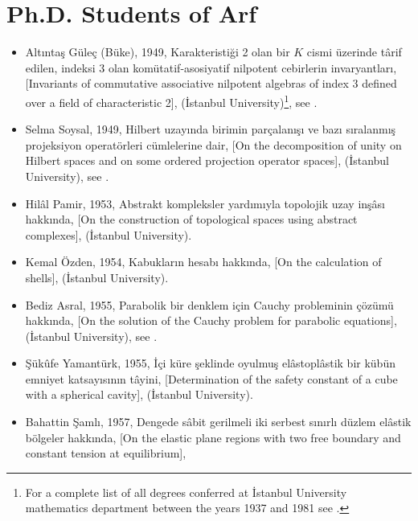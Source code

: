 \documentclass[12pt]{amsart}
\begin{document}
\section{Ph.D. Students of Arf}
\begin{itemize}
\item Alt{\i}nta\c{s} G\"{u}le\c{c} (B\"{u}ke), 1949, Karakteristi\u{g}i 2 olan bir $K$ cismi \"{u}zerinde t\^{a}rif edilen, indeksi 3 olan kom\"{u}tatif-asosiyatif nilpotent cebirlerin invaryantlar{\i}, [Invariants of commutative associative nilpotent algebras of index 3 defined over a field of characteristic 2], ({\.I}stanbul University)\footnote{For a complete list of all degrees conferred at {\.I}stanbul University mathematics department between the years 1937 and 1981 see \cite{ozemre}.},
see \cite{buke}.
\\
\item Selma Soysal, 1949, Hilbert uzay{\i}nda birimin par\c{c}alan{\i}\c{s}{\i} ve baz{\i} s{\i}ralanm{\i}\c{s} projeksiyon operat\"{o}rleri c\"{u}mlelerine dair, [On the decomposition of unity on Hilbert spaces and on some ordered projection operator spaces], ({\.I}stanbul University),
see \cite{soysal}.
\\
\item Hil\^{a}l Pamir, 1953, Abstrakt kompleksler yard{\i}m{\i}yla topolojik uzay in\c{s}\^{a}s{\i} hakk{\i}nda, [On the construction of topological spaces using abstract complexes], ({\.I}stanbul University).
\\
\item Kemal \"{O}zden, 1954, Kabuklar{\i}n hesab{\i} hakk{\i}nda, [On the calculation of shells], ({\.I}stanbul University).
\\
\item Bediz Asral, 1955, Parabolik bir denklem i\c{c}in  Cauchy probleminin \c{c}\"{o}z\"{u}m\"{u} hakk{\i}nda, [On the solution of the Cauchy problem for parabolic equations], ({\.I}stanbul University), see \cite{asral}.
\\
\item \c{S}\"{u}k\^{u}fe Yamant\"{u}rk, 1955, {\.I}\c{c}i k\"{u}re \c{s}eklinde oyulmu\c{s} el\^{a}stopl\^{a}stik bir k\"{u}b\"{u}n emniyet katsay{\i}s{\i}n{\i}n t\^{a}yini, [Determination of the safety constant of a cube with a spherical cavity],
({\.I}stanbul University).
\\
\item Bahattin \c{S}aml{\i}, 1957, Dengede s\^{a}bit gerilmeli iki serbest s{\i}n{\i}rl{\i} d\"{u}zlem el\^{a}stik b\"{o}lgeler hakk{\i}nda, [On the elastic plane regions with two free boundary and constant tension at equilibrium],

\end{itemize}
\end{document}

